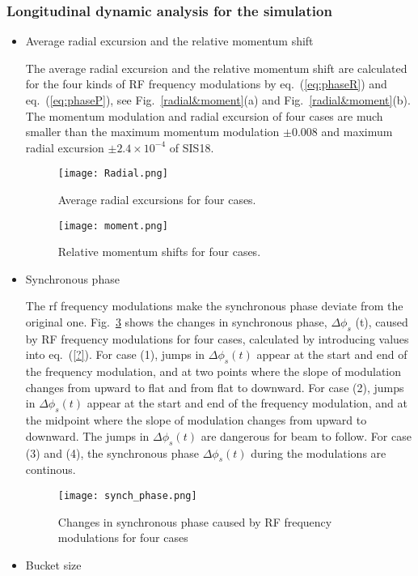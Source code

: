 \subsubsection{Longitudinal dynamic analysis for the simulation}
\begin{itemize}
\item Average radial excursion and the relative momentum shift

The average radial excursion and the relative momentum shift are calculated for the four kinds of RF frequency modulations by eq.~(\ref{eq:phaseR}) and eq.~(\ref{eq:phaseP}), see Fig.~\ref{radial&moment}(a) and Fig.~\ref{radial&moment}(b). The momentum modulation and radial excursion of four cases are much smaller than the maximum momentum modulation $\pm 0.008$ and maximum radial excursion $\pm 2.4\times10^{-4}$ of SIS18.
\begin{figure}[!htb]
   \centering   
   \texttt{[image: Radial.png]}
   \caption{Average radial excursions for four cases.}
   \label{radial}
\end{figure}
\begin{figure}[!htb]
   \centering   
   \texttt{[image: moment.png]}
   \caption{Relative momentum shifts for four cases.}
   \label{moment}
\end{figure}
\item Synchronous phase

The rf frequency modulations make the synchronous phase deviate from the original one. Fig.~\ref{synch_phase} shows the changes in synchronous phase, $\Delta \phi_s$ (t), caused by RF frequency modulations for four cases, calculated by introducing values into eq.~(\ref{?}). For case (1), jumps in $\Delta \phi_s(t)$ appear at the start and end of the frequency modulation, and at two points where the slope of modulation changes from upward to flat and from flat to downward. For case (2), jumps in $\Delta \phi_s(t)$ appear at the start and end of the frequency modulation, and at the midpoint where the slope of modulation changes from upward to downward. The jumps in $\Delta \phi_s(t)$ are dangerous for beam to follow. For case (3) and (4), the  synchronous phase $\Delta \phi_s(t)$ during the modulations are continous.
\begin{figure}[!htb]
   \centering   
   \texttt{[image: synch\_phase.png]}
   \caption{Changes in synchronous phase caused by RF frequency modulations for four cases}
   \label{synch_phase}
\end{figure}
\item Bucket size


\end{itemize}
